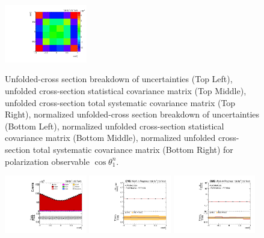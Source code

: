 \begin{refsection}
\begin{figure}[htb]
\begin{center}
 \includegraphics[width=0.32\textwidth]{fig_fullRun2UL/unfolding/combined/TotalSystCovMatrixNorm_rebinnedB_b1n.pdf} \\
\caption{Unfolded-cross section breakdown of uncertainties (Top Left), unfolded cross-section statistical covariance matrix (Top Middle), unfolded cross-section total systematic covariance matrix (Top Right), normalized unfolded-cross section breakdown of uncertainties (Bottom Left), normalized unfolded cross-section statistical covariance matrix (Bottom Middle), normalized unfolded cross-section total systematic covariance matrix (Bottom Right) for polarization observable $\cos\theta_{1}^{n}$.}
\label{fig:b1n_uncertainties}
\end{center}
\end{figure}
\clearpage
\begin{figure}[htb]
\begin{center}
 \includegraphics[width=0.32\textwidth]{fig_fullRun2UL/controlplots/combined/Hyp_LeptonBn.pdf}
 \includegraphics[width=0.32\textwidth]{fig_fullRun2UL/unfolding/combined/UnfoldedResults_b2n.pdf}
 \includegraphics[width=0.32\textwidth]{fig_fullRun2UL/unfolding/combined/UnfoldedResultsNorm_b2n.pdf} \\

\end{center}
\end{figure}
\end{refsection}
